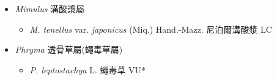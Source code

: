 
  \begin{itemize}
 \item[] \textit{Mimulus} 溝酸漿屬
                                
  \begin{itemize}
        \item[] \textit{M. tenellus} var. \textit{japonicus} (Miq.) Hand.-Mazz.  尼泊爾溝酸漿   LC
  \end{itemize}
 \item[] \textit{Phryma} 透骨草屬(蠅毒草屬)
                                
  \begin{itemize}
        \item[] \textit{P. leptostachya} L.  蠅毒草   VU*
  \end{itemize}
  \end{itemize}
